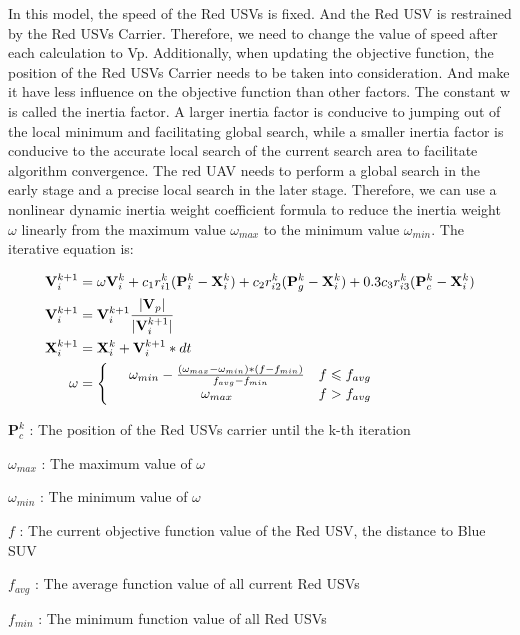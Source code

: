 \documentclass{mcmthesis}
\begin{document}
	In this model, the speed of the Red USVs is fixed. And the Red USV is restrained by the Red USVs Carrier. Therefore, we need to change the value of speed after each calculation to Vp. Additionally, when updating the objective function, the position of the  Red USVs Carrier needs to be taken into consideration. And make it have less influence on the objective function than other factors. The constant w is called the inertia factor. A larger inertia factor is conducive to jumping out of the local minimum and facilitating global search, while a smaller inertia factor is conducive to the accurate local search of the current search area to facilitate algorithm convergence. The red UAV needs to perform a global search in the early stage and a precise local search in the later stage. Therefore, we can use a nonlinear dynamic inertia weight coefficient formula to reduce the inertia weight $\omega$ linearly from the maximum value $\omega_{max}$ to the minimum value $\omega_{min}$. The iterative equation is:

\begin{align}
\mathbf{V}_i^{k+1} & =\omega \mathbf{V}_i^k + c_1 r_{i1}^k (\mathbf{P}_i^k - \mathbf{X}_i^k) + c_2 r_{i2}^k (\mathbf{P}_g^k - \mathbf{X}_i^k) + 0.3 c_3 r_{i3}^k (\mathbf{P}_c^k - \mathbf{X}_i^k) \\
\mathbf{V}_i^{k+1} & = \mathbf{V}_i^{k+1} \cfrac {|\mathbf{V}_p|}{|\mathbf{V}_i^{k+1}|} \\
\mathbf{X}_i^{k+1} & = \mathbf{X}_i^k + \mathbf{V}_i^{k+1} * dt \\
\omega & =\left\{
\begin{array}{rcl}
& \omega_{min} - \frac{(\omega_{max} - \omega_{min}) * (f-f_{min})}{f_{avg} - f_{min}}& f\leqslant f_{avg} \\
& \omega_{max} & f > f_{avg}
\end{array} \right.
\end{align}

    $\mathbf{P}_c^k$ : The position of the Red USVs carrier until the k-th iteration \par
	$\omega_{max}$ : The maximum value of $\omega$ \par
	$\omega_{min}$ : The minimum value of $\omega$ \par
	$f$ : The current objective function value of the Red USV, the distance to Blue SUV \par
	$f_{avg}$ : The average function value of all current Red USVs \par
	$f_{min}$ : The minimum function value of all Red USVs \par
\end{document}
